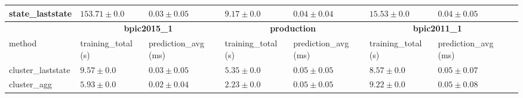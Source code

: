 \documentclass[twoside,11pt]{Latex/Classes/PhDthesisPSnPDF}
\begin{document}
\begin{table}[!htbp]
{\begin{tabular}{llllllll}
					state\_laststate & $153.71 \pm 0.0$ & $0.03 \pm 0.05$ & $9.17 \pm 0.0$ & $0.04 \pm 0.04$ & $15.53 \pm 0.0$ & $0.04 \pm 0.05$ \\ 
					\bottomrule
					\toprule
					& \multicolumn{2}{c}{{\bfseries bpic2015\_1}} & \multicolumn{2}{c}{{\bfseries production}} & \multicolumn{2}{c}{{\bfseries bpic2011\_1}} \\ \cmidrule(lr){2-3} \cmidrule(lr){4-5} \cmidrule(lr){6-7}
					method  & training\_total (s) & prediction\_avg (ms) & training\_total (s) & prediction\_avg (ms) & training\_total (s) & prediction\_avg (ms) \\ \midrule
					cluster\_laststate & $9.57 \pm 0.0$ & $0.03 \pm 0.05$ & $5.35 \pm 0.0$ & $0.05 \pm 0.05$ & $8.57 \pm 0.0$ & $0.05 \pm 0.07$ \\ 
					cluster\_agg & $5.93 \pm 0.0$ & $0.02 \pm 0.04$ & $2.23 \pm 0.0$ & $0.05 \pm 0.05$ & $9.22 \pm 0.0$ & $0.05 \pm 0.08$ \\ 
					

\end{tabular}}
\end{table}
\end{document}
